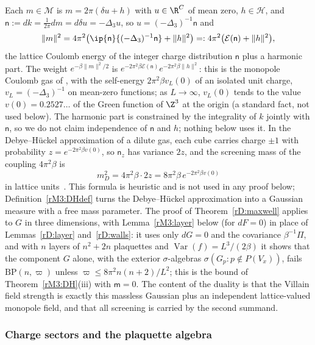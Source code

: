 \begin{remark}\label{rM3:coulomb}
Each $m\in\mathcal M$ is $m=2\pi(\delta u+h)$ with $u\in\R^C$ of mean
zero, $h\in\mathcal H$, and $\mathsf n:=dk=\frac1{2\pi}dm=d\delta u=
-\Delta_3u$, so $u=(-\Delta_3)^{-1}\mathsf n$ and
\[
\lVert m\rVert^2=4\pi^2\bigl(\ip{\mathsf n}{(-\Delta_3)^{-1}\mathsf n}
+\lVert h\rVert^2\bigr)=:4\pi^2\bigl(\mathcal E(\mathsf n)+\lVert h
\rVert^2\bigr),
\]
the lattice Coulomb energy of the integer charge distribution $\mathsf n$
plus a harmonic part. The weight $e^{-\beta\lVert m\rVert^2/2}$ is
$e^{-2\pi^2\beta\mathcal E(\mathsf n)}e^{-2\pi^2\beta\lVert h\rVert^2}$:
this is the monopole Coulomb gas of \cite{BMK77,GM82}, with the
self-energy $2\pi^2\beta v_L(0)$ of an isolated unit charge,
$v_L=(-\Delta_3)^{-1}$ on mean-zero functions; as $L\to\infty$,
$v_L(0)$ tends to the value $v(0)=0.2527\ldots$ of the Green function
of $\Z^3$ at the origin (a standard fact, not used below). The harmonic
part is constrained by the integrality of $k$ jointly with $\mathsf n$,
so we do not claim independence of $\mathsf n$ and $h$; nothing below
uses it. In the Debye--H\"uckel approximation of a dilute gas, each
cube carries charge $\pm1$ with probability $z=e^{-2\pi^2\beta v(0)}$, so
$\mathsf n_z$ has variance $2z$, and the screening mass of the coupling
$4\pi^2\beta$ is
\[
m_D^2=4\pi^2\beta\cdot2z=8\pi^2\beta\,e^{-2\pi^2\beta v(0)}
\]
in lattice units~\cite{Pol77,BMK77}. This formula is heuristic and is
not used in any proof below; Definition~\ref{rM3:DHdef} turns the
Debye--H\"uckel approximation into a Gaussian measure with a free mass
parameter. The proof of Theorem~\ref{rD:maxwell} applies to $G$ in
three dimensions, with Lemma~\ref{rM3:layer} below (for $dF=0$) in place
of Lemmas~\ref{rD:layer} and~\ref{rD:walls}: it uses only $dG=0$ and
the covariance $\beta^{-1}\Pi$, and with $n$ layers of $n^2+2n$
plaquettes and $\operatorname{Var}(f)=L^3/(2\beta)$ it shows that the
component $G$ alone, with the exterior $\sigma$-algebras
$\sigma(G_p:p\notin P(V_x))$, fails $\mathrm{BP}(n,\varpi)$ unless
$\varpi\le8\pi^2n(n+2)/L^2$; this is the bound of
Theorem~\ref{rM3:DH}(iii) with $\mathsf m=0$. The
content of the duality is that the Villain field strength is exactly
this massless Gaussian plus an independent lattice-valued monopole field,
and that all screening is carried by the second summand.
\end{remark}

\subsubsection{Charge sectors and the plaquette algebra}\label{rM3:sectors}

